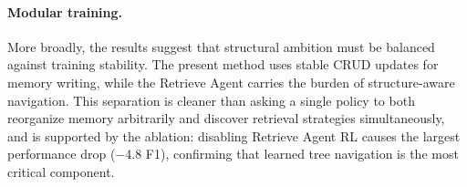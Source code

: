 \paragraph{Modular training.}
More broadly, the results suggest that structural ambition must be balanced against training stability. The present method uses stable CRUD updates for memory writing, while the Retrieve Agent carries the burden of structure-aware navigation. This separation is cleaner than asking a single policy to both reorganize memory arbitrarily and discover retrieval strategies simultaneously, and is supported by the ablation: disabling Retrieve Agent RL causes the largest performance drop ($-$4.8 F1), confirming that learned tree navigation is the most critical component.
